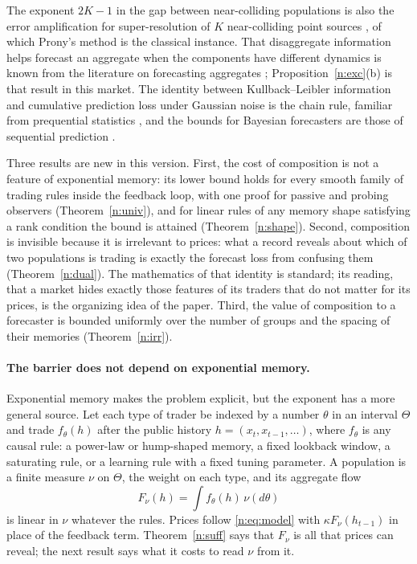  The exponent $2K-1$ in the gap between near-colliding populations is also the error amplification for super-resolution of $K$ near-colliding point sources \citep{batenkov2021}, of which Prony's method is the classical instance. That disaggregate information helps forecast an aggregate when the components have different dynamics is known from the literature on forecasting aggregates \citep{lutkepohl1987,hendry2011}; Proposition~\ref{n:exc}(b) is that result in this market. The identity between Kullback--Leibler information and cumulative prediction loss under Gaussian noise is the chain rule, familiar from prequential statistics \citep{dawid1984}, and the bounds for Bayesian forecasters are those of sequential prediction \citep{vovk2001,cesabianchi2006}.

 Three results are new in this version. First, the cost of composition is not a feature of exponential memory: its lower bound holds for every smooth family of trading rules inside the feedback loop, with one proof for passive and probing observers (Theorem~\ref{n:univ}), and for linear rules of any memory shape satisfying a rank condition the bound is attained (Theorem~\ref{n:shape}). Second, composition is invisible because it is irrelevant to prices: what a record reveals about which of two populations is trading is exactly the forecast loss from confusing them (Theorem~\ref{n:dual}). The mathematics of that identity is standard; its reading, that a market hides exactly those features of its traders that do not matter for its prices, is the organizing idea of the paper. Third, the value of composition to a forecaster is bounded uniformly over the number of groups and the spacing of their memories (Theorem~\ref{n:irr}).

\paragraph{The barrier does not depend on exponential memory.} Exponential memory makes the problem explicit, but the exponent has a more general source. Let each type of trader be indexed by a number $\theta$ in an interval $\Theta$ and trade $f_\theta(h)$ after the public history $h=(x_t,x_{t-1},\ldots)$, where $f_\theta$ is any causal rule: a power-law or hump-shaped memory, a fixed lookback window, a saturating rule, or a learning rule with a fixed tuning parameter. A population is a finite measure $\nu$ on $\Theta$, the weight on each type, and its aggregate flow
\[
F_\nu(h)=\int f_\theta(h)\,\nu(d\theta)
\]
is linear in $\nu$ whatever the rules. Prices follow \eqref{n:eq:model} with $\kappa F_\nu(h_{t-1})$ in place of the feedback term. Theorem~\ref{n:suff} says that $F_\nu$ is all that prices can reveal; the next result says what it costs to read $\nu$ from it.

